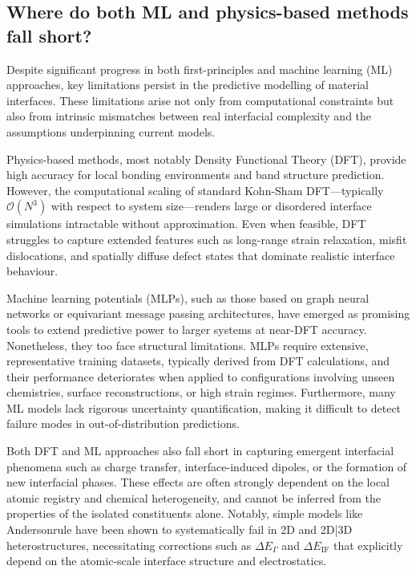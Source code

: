 \subsection{Where do both ML and physics-based methods fall short?} 
 
Despite significant progress in both first-principles and machine learning (ML) approaches, key limitations persist in the predictive modelling of material interfaces. These limitations arise not only from computational constraints but also from intrinsic mismatches between real interfacial complexity and the assumptions underpinning current models. 
 
Physics-based methods, most notably Density Functional Theory (DFT), provide high accuracy for local bonding environments and band structure prediction. However, the computational scaling of standard Kohn-Sham DFT---typically $\mathcal{O}(N^3)$ with respect to system size---renders large or disordered interface simulations intractable without approximation. Even when feasible, DFT struggles to capture extended features such as long-range strain relaxation, misfit dislocations, and spatially diffuse defect states that dominate realistic interface behaviour. 
 
Machine learning potentials (MLPs), such as those based on graph neural networks or equivariant message passing architectures, have emerged as promising tools to extend predictive power to larger systems at near-DFT accuracy. Nonetheless, they too face structural limitations. MLPs require extensive, representative training datasets, typically derived from DFT calculations, and their performance deteriorates when applied to configurations involving unseen chemistries, surface reconstructions, or high strain regimes. Furthermore, many ML models lack rigorous uncertainty quantification, making it difficult to detect failure modes in out-of-distribution predictions. 
 
Both DFT and ML approaches also fall short in capturing emergent interfacial phenomena such as charge transfer, interface-induced dipoles, or the formation of new interfacial phases. These effects are often strongly dependent on the local atomic registry and chemical heterogeneity, and cannot be inferred from the properties of the isolated constituents alone. Notably, simple models like Anderson\rqss rule have been shown to systematically fail in 2D and 2D|3D heterostructures, necessitating corrections such as $\Delta E_\Gamma$ and $\Delta E_\mathrm{IF}$ that explicitly depend on the atomic-scale interface structure and electrostatics. 
 
